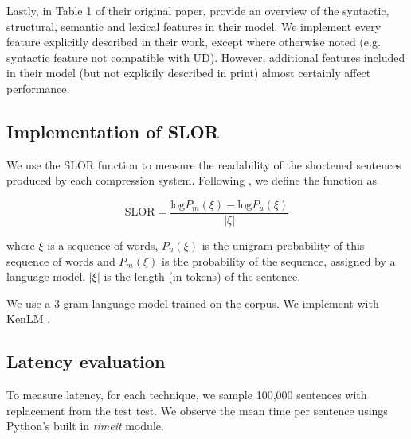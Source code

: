 Lastly, in Table 1 of their original paper, \citet{filippova2013overcoming} provide an overview of the syntactic, structural, semantic and lexical features in their model. We implement every feature explicitly described in their work, except where otherwise noted (e.g. syntactic feature not compatible with UD). However, additional features included in their model (but not explicily described in print) almost certainly affect performance. 

\subsection{Implementation of SLOR}

We use the SLOR function to measure the readability of the shortened sentences produced by each compression system. Following \cite{lau2015unsupervised}, we define the function as 

\begin{equation}
\text{SLOR}=\frac{\text{log}P_m(\xi) - \text{log}P_u(\xi)}{|\xi|}
\end{equation}

where $\xi$ is a sequence of words, $P_u(\xi)$ is the unigram probability of this sequence of words and $P_m(\xi)$ is the probability of the sequence, assigned by a language model.  $|\xi|$ is the length (in tokens) of the sentence.

We use a 3-gram language model trained on the \citet{filippova2013overcoming} corpus. We implement with KenLM \cite{Heafield-kenlm}.

\subsection{Latency evaluation}
To measure latency, for each technique, we sample 100,000 sentences with replacement from the test test. We observe the mean time per sentence usings Python's built in \textit{timeit} module.



